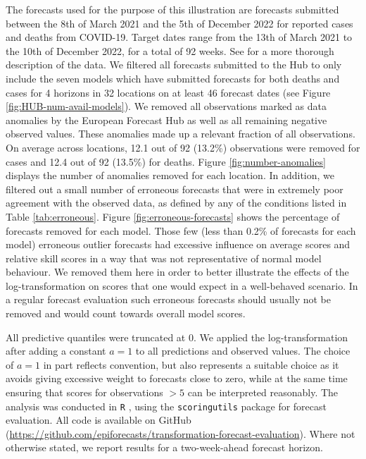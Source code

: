 \documentclass{article}
\begin{document}
The forecasts used for the purpose of this illustration are forecasts submitted between the 8th of March 2021 and the 5th of December 2022 for reported cases and deaths from COVID-19. Target dates range from the 13th of March 2021 to the 10th of December 2022, for a total of 92 weeks. See \cite{sherrattPredictivePerformanceMultimodel2022} for a more thorough description of the data. We filtered all forecasts submitted to the Hub to only include the seven models which have submitted forecasts for both deaths and cases for 4 horizons in 32 locations on at least 46 forecast dates (see Figure \ref{fig:HUB-num-avail-models}). We removed all observations marked as data anomalies by the European Forecast Hub \citep{sherrattPredictivePerformanceMultimodel2022} as well as all remaining negative observed values. These anomalies made up a relevant fraction of all observations. On average across locations, 12.1 out of 92 (13.2\%) observations were removed for cases and 12.4 out of 92 (13.5\%) for deaths. Figure \ref{fig:number-anomalies} displays the number of anomalies removed for each location. In addition, we filtered out a small number of erroneous forecasts that were in extremely poor agreement with the observed data, as defined by any of the conditions listed in Table \ref{tab:erroneous}. Figure \ref{fig:erroneous-forecasts} shows the percentage of forecasts removed for each model. Those few (less than 0.2\%  of forecasts for each model) erroneous outlier forecasts had excessive influence on average scores and relative skill scores in a way that was not representative of normal model behaviour. We removed them here in order to better illustrate the effects of the log-transformation on scores that one would expect in a well-behaved scenario. In a regular forecast evaluation such erroneous forecasts should usually not be removed and would count towards overall model scores. 

All predictive quantiles were truncated at 0. We applied the log-transformation after adding a constant $a = 1$ to all predictions and observed values. The choice of $a = 1$ in part reflects convention, but also represents a suitable choice as it avoids giving excessive weight to forecasts close to zero, while at the same time ensuring that scores for observations $> 5$ can be interpreted reasonably. The analysis was conducted in \texttt{R} \citep{R}, using the \texttt{scoringutils} package \citep{bosseEvaluatingForecastsScoringutils2022} for forecast evaluation. All code is available on GitHub 
(\url{https://github.com/epiforecasts/transformation-forecast-evaluation}). Where not otherwise stated, we report results for a two-week-ahead forecast horizon. 
\end{document}
